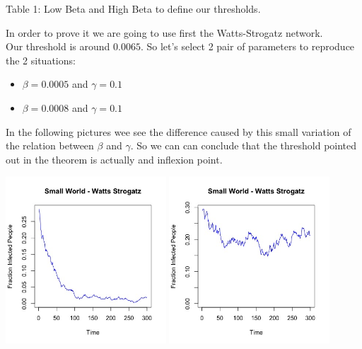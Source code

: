 \documentclass{article}
\begin{document}
\begin{center}
Table 1: Low Beta and High Beta to define our thresholds.
\end{center}

\noindent In order to prove it we are going to use first the Watts-Strogatz network.\\

\noindent Our threshold is around $0.0065$. So let's select 2 pair of parameters to reproduce the 2 situations:\\

\begin{itemize}
  \item $\beta = 0.0005$ and $\gamma = 0.1$
  \item $\beta = 0.0008$ and $\gamma = 0.1$\\
\end{itemize}

\noindent In the following pictures wee see the difference caused by this small variation of the relation between $\beta$ and $\gamma$. So we can can conclude that the threshold pointed out in the theorem is actually and inflexion point.

\begin{center}
   
    
    \includegraphics[width=6cm]{watts_strogatz_small.jpeg}
    \includegraphics[width=6cm]{watts_strogatz_big.jpeg}
    
    
\end{center}
\newpage
\end{document}

